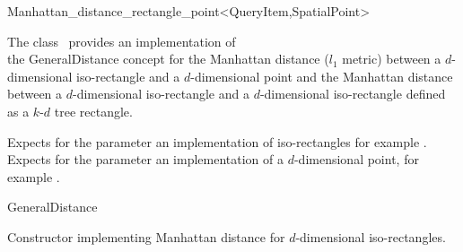 

\begin{ccRefClass}{Manhattan_distance_rectangle_point<QueryItem,SpatialPoint>}  %


\ccDefinition
  
The class \ccRefName\ provides an implementation of \\
the GeneralDistance concept
for the Manhattan distance ($l_1$ metric)
between a $d$-dimensional iso-rectangle and a $d$-dimensional point 
and the Manhattan distance between a $d$-dimensional iso-rectangle
and a $d$-dimensional iso-rectangle defined as a $k$-$d$ tree rectangle.


\ccParameters

Expects for the parameter 
 an implementation of iso-rectangles
for example .
Expects for the parameter  an implementation
of a $d$-dimensional point, for example .

\ccIsModel

GeneralDistance

\ccTypes


\ccCreation
{}  %


{Constructor implementing Manhattan distance for
$d$-dimensional iso-rectangles.}

\ccOperations


\end{ccRefClass}
